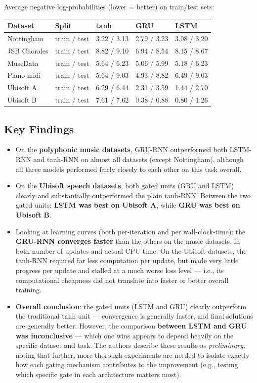 \documentclass[12pt,openany]{book}
\theoremstyle{definition}
\theoremstyle{remark}
\begin{document}
Average negative log-probabilities (lower = better) on train/test sets:

{\small
\setlength{\tabcolsep}{3pt}
\begin{longtable}{@{}L{0.22\textwidth}L{0.13\textwidth}L{0.19\textwidth}L{0.19\textwidth}L{0.19\textwidth}@{}}
\toprule
Dataset & Split & tanh & GRU & LSTM \\
\midrule
Nottingham & train / test & 3.22 / 3.13 & 2.79 / 3.23 & 3.08 / 3.20 \\
JSB Chorales & train / test & 8.82 / 9.10 & 6.94 / 8.54 & 8.15 / 8.67 \\
MuseData & train / test & 5.64 / 6.23 & 5.06 / 5.99 & 5.18 / 6.23 \\
Piano-midi & train / test & 5.64 / 9.03 & 4.93 / 8.82 & 6.49 / 9.03 \\
Ubisoft A & train / test & 6.29 / 6.44 & 2.31 / 3.59 & 1.44 / 2.70 \\
Ubisoft B & train / test & 7.61 / 7.62 & 0.38 / 0.88 & 0.80 / 1.26 \\
\bottomrule
\end{longtable}
}

\subsection{Key Findings}

\begin{itemize}
\item On the \textbf{polyphonic music datasets}, GRU-RNN outperformed both LSTM-RNN and tanh-RNN on almost all datasets (except Nottingham), although all three models performed fairly closely to each other on this task overall.
\item On the \textbf{Ubisoft speech datasets}, both gated units (GRU and LSTM) clearly and substantially outperformed the plain tanh-RNN. Between the two gated units: \textbf{LSTM was best on Ubisoft A}, while \textbf{GRU was best on Ubisoft B}.
\item Looking at learning curves (both per-iteration and per wall-clock-time): the \textbf{GRU-RNN converges faster} than the others on the music datasets, in both number of updates and actual CPU time. On the Ubisoft datasets, the tanh-RNN required far less computation per update, but made very little progress per update and stalled at a much worse loss level --- i.e., its computational cheapness did not translate into faster or better overall training.
\item \textbf{Overall conclusion}: the gated units (LSTM and GRU) clearly outperform the traditional tanh unit --- convergence is generally faster, and final solutions are generally better. However, the comparison \textbf{between LSTM and GRU was inconclusive} --- which one wins appears to depend heavily on the specific dataset and task. The authors describe these results as \emph{preliminary}, noting that further, more thorough experiments are needed to isolate exactly how each gating mechanism contributes to the improvement (e.g., testing which specific gate in each architecture matters most).

\end{itemize}
\end{document}
